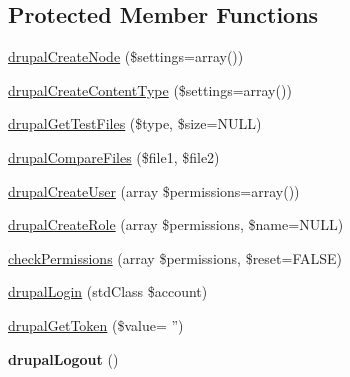 \subsection*{Protected Member Functions}
\begin{DoxyCompactItemize}
\item 
\hyperlink{classDrupalWebTestCase_a73daf1ecd169e59a2acc47d57f06572f}{drupalCreateNode} (\$settings=array())
\item 
\hyperlink{classDrupalWebTestCase_a880b99e54830cd0a56e2f37b65ec337f}{drupalCreateContentType} (\$settings=array())
\item 
\hyperlink{classDrupalWebTestCase_ad1439acbfb7b5cd34e851d49106ba92f}{drupalGetTestFiles} (\$type, \$size=NULL)
\item 
\hyperlink{classDrupalWebTestCase_a7bdda4e6c7063f5dbcfecb1c70a03432}{drupalCompareFiles} (\$file1, \$file2)
\item 
\hyperlink{classDrupalWebTestCase_acc3d96e30db573b45744aef79af11862}{drupalCreateUser} (array \$permissions=array())
\item 
\hyperlink{classDrupalWebTestCase_ac704af37ef0e0d824af1407265bf750d}{drupalCreateRole} (array \$permissions, \$name=NULL)
\item 
\hyperlink{classDrupalWebTestCase_a12e53962cb95e9f6eb86efcc09b08615}{checkPermissions} (array \$permissions, \$reset=FALSE)
\item 
\hyperlink{classDrupalWebTestCase_adfe40530cc8242db7a5e42542c20cfc2}{drupalLogin} (stdClass \$account)
\item 
\hyperlink{classDrupalWebTestCase_a737d7788ee07da4f0184b6d489694070}{drupalGetToken} (\$value= '')
\item 
\hypertarget{classDrupalWebTestCase_a42e774876bd06cda74024379a3159896}{
{\bfseries drupalLogout} ()}
\label{classDrupalWebTestCase_a42e774876bd06cda74024379a3159896}


\end{DoxyCompactItemize}
